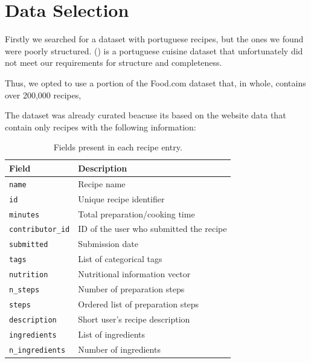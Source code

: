 \documentclass[conference]{IEEEtran}
\begin{document}
\section{Data Selection}



\noindent

\noindent
Firstly we searched for a dataset with portuguese recipes, but the ones we found were poorly structured.
(\cite{portuguese_meals_kaggle}) is a portuguese cuisine dataset that unfortunately did not meet our requirements for structure and completeness.

\noindent
Thus, we opted to use a portion of the Food.com \cite{foodcom_kaggle} dataset that, in whole, contains over 200,000 recipes, 

\noindent
The dataset was already curated beacuse its based on the website data that contain only recipes with the following information:

\begin{table}[h!]
\centering
\caption{Fields present in each recipe entry.}
\label{tab:recipe-fields}
\begin{tabularx}{\columnwidth}{@{} l @{\hspace{1.5em}} Y @{}}
\toprule
\textbf{Field} & \textbf{Description} \\
\midrule
\texttt{name} & Recipe name \\
\texttt{id} & Unique recipe identifier \\
\texttt{minutes} & Total preparation/cooking time \\
\texttt{contributor\_id} & ID of the user who submitted the recipe \\
\texttt{submitted} & Submission date \\
\texttt{tags} & List of categorical tags \\
\texttt{nutrition} & Nutritional information vector \\
\texttt{n\_steps} & Number of preparation steps \\
\texttt{steps} & Ordered list of preparation steps \\
\texttt{description} & Short user's recipe description \\
\texttt{ingredients} & List of ingredients \\
\texttt{n\_ingredients} & Number of ingredients \\
\bottomrule
\end{tabularx}
\end{table}
\end{document}
